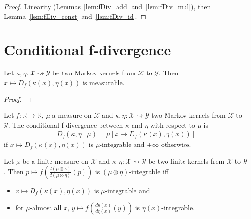 \begin{proof}
Linearity (Lemmas~\ref{lem:fDiv_add} and~\ref{lem:fDiv_mul}), then Lemma~\ref{lem:fDiv_const} and~\ref{lem:fDiv_id}.
\end{proof}

\section{Conditional f-divergence}

\begin{lemma}
  \label{lem:measurable_fDiv}
  Let $\kappa, \eta : \mathcal X \rightsquigarrow \mathcal Y$ be two Markov kernels from $\mathcal X$ to $\mathcal Y$. Then $x \mapsto D_f(\kappa(x), \eta(x))$ is measurable.
\end{lemma}

\begin{proof}
\end{proof}

\begin{definition}
  \label{def:condFDiv}
  \leanok
  Let $f : \mathbb{R} \to \mathbb{R}$, $\mu$ a measure on $\mathcal X$ and $\kappa, \eta : \mathcal X \rightsquigarrow \mathcal Y$ two Markov kernels from $\mathcal X$ to $\mathcal Y$. The conditional f-divergence between $\kappa$ and $\eta$ with respect to $\mu$ is
  \begin{align*}
  D_f(\kappa, \eta \mid \mu) = \mu\left[x \mapsto D_f(\kappa(x), \eta(x))\right]
  \end{align*}
  if $x \mapsto D_f(\kappa(x), \eta(x))$ is $\mu$-integrable and $+\infty$ otherwise.
\end{definition}

\begin{lemma}
  \label{lem:integrable_fDiv_compProd_iff}
  \leanok
  Let $\mu$ be a finite measure on $\mathcal X$ and $\kappa, \eta : \mathcal X \rightsquigarrow \mathcal Y$ be two finite kernels from $\mathcal X$ to $\mathcal Y$.
  Then $p \mapsto f \left(\frac{d(\mu \otimes \kappa)}{d(\mu \otimes \eta)}(p)\right)$ is $(\mu \otimes \eta)$-integrable iff
  \begin{itemize}
    \item $x \mapsto D_f(\kappa(x), \eta(x))$ is $\mu$-integrable and
    \item for $\mu$-almost all $x$, $y \mapsto f \left( \frac{d\kappa(x)}{d\eta(x)}(y) \right)$ is $\eta(x)$-integrable. 
  \end{itemize}
\end{lemma}

